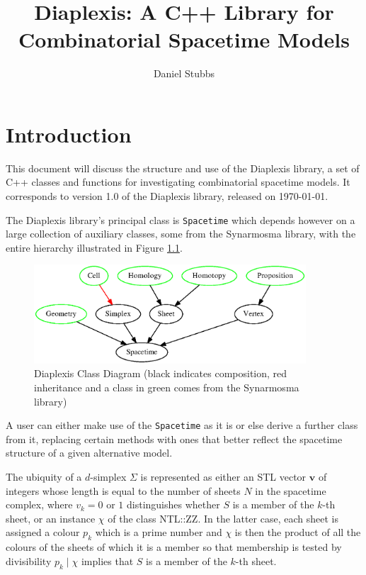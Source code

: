 \documentclass[12pt,letterpaper]{report}
\begin{document}
\newcommand{\double}{\par\setlength{\baselineskip}{22pt}}

\providecommand{\abs}[1]{\left\lvert#1\right\rvert}
\providecommand{\norm}[1]{\left\lVert#1\right\rVert}

\pagestyle{plain}

\title{Diaplexis: A C++ Library for Combinatorial Spacetime Models}
\author{Daniel Stubbs}

\maketitle

\newpage

\double

\chapter{Introduction}

This document will discuss the structure and use of the Diaplexis library, a set of C++ 
classes and functions for investigating combinatorial spacetime models. It corresponds 
to version 1.0 of the Diaplexis library, released on \today.  

The Diaplexis library's principal class is \texttt{Spacetime} which depends however on a 
large collection of auxiliary classes, some from the Synarmosma library, with the entire 
hierarchy illustrated in Figure \ref{fig:class_hierarchy}. 
\begin{figure}[htb]
\centering
\includegraphics[width=4in]{images/class_hierarchy.eps}
\caption{Diaplexis Class Diagram (black indicates composition, red inheritance and a 
class in green comes from the Synarmosma library)}
\label{fig:class_hierarchy}
\end{figure}
A user can either make use of the \texttt{Spacetime} as it is or else derive a further class 
from it, replacing certain methods with ones that better reflect the spacetime structure of 
a given alternative model. 

The ubiquity of a $d$-simplex $\Sigma$ is represented as either an STL vector $\mathbf{v}$ of integers 
whose length is equal to the number of sheets $N$ in the spacetime complex, where $v_k=0$ or 
$1$ distinguishes whether $S$ is a member of the $k$-th sheet, or an instance $\chi$ of the 
class NTL::ZZ. In the latter case, each sheet is assigned a colour $p_k$ which is a prime number 
and $\chi$ is then the product of all the colours of the sheets of which it is a member so that 
membership is tested by divisibility $p_k \mid \chi$ implies that $S$ is a member of the $k$-th 
sheet. 
\end{document}
